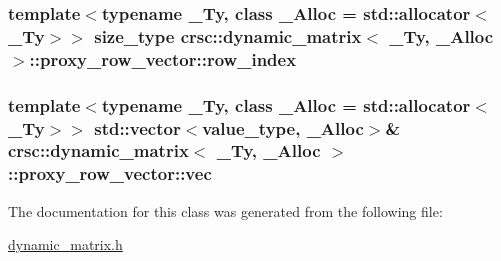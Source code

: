 \subsubsection[{\texorpdfstring{row\+\_\+index}{row_index}}]{\setlength{\rightskip}{0pt plus 5cm}template$<$typename \+\_\+\+Ty, class \+\_\+\+Alloc = std\+::allocator$<$\+\_\+\+Ty$>$$>$ {\bf size\+\_\+type} {\bf crsc\+::dynamic\+\_\+matrix}$<$ \+\_\+\+Ty, \+\_\+\+Alloc $>$\+::proxy\+\_\+row\+\_\+vector\+::row\+\_\+index\hspace{0.3cm}{\ttfamily [private]}}\hypertarget{classcrsc_1_1dynamic__matrix_1_1proxy__row__vector_a07775ac5fb7d5430fdc2de197f811feb}{}\label{classcrsc_1_1dynamic__matrix_1_1proxy__row__vector_a07775ac5fb7d5430fdc2de197f811feb}
\subsubsection[{\texorpdfstring{vec}{vec}}]{\setlength{\rightskip}{0pt plus 5cm}template$<$typename \+\_\+\+Ty, class \+\_\+\+Alloc = std\+::allocator$<$\+\_\+\+Ty$>$$>$ std\+::vector$<${\bf value\+\_\+type}, \+\_\+\+Alloc$>$\& {\bf crsc\+::dynamic\+\_\+matrix}$<$ \+\_\+\+Ty, \+\_\+\+Alloc $>$\+::proxy\+\_\+row\+\_\+vector\+::vec\hspace{0.3cm}{\ttfamily [private]}}\hypertarget{classcrsc_1_1dynamic__matrix_1_1proxy__row__vector_a8f98e13d29cac1555690c8ea6313d428}{}\label{classcrsc_1_1dynamic__matrix_1_1proxy__row__vector_a8f98e13d29cac1555690c8ea6313d428}


The documentation for this class was generated from the following file\+:\begin{DoxyCompactItemize}
\item 
\hyperlink{dynamic__matrix_8h}{dynamic\+\_\+matrix.\+h}\end{DoxyCompactItemize}
